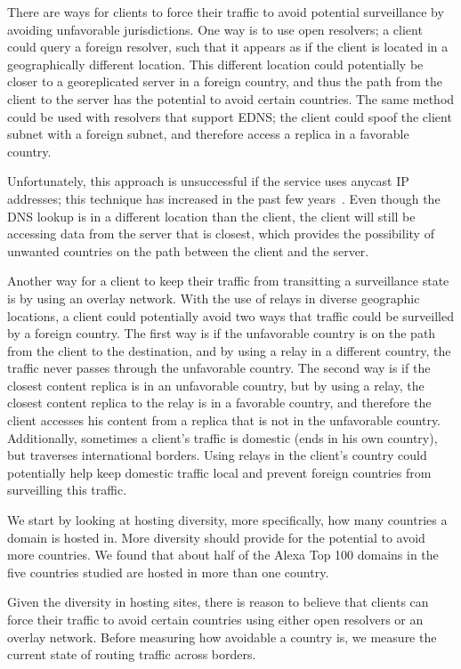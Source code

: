 There are ways for clients to force their traffic to avoid potential
surveillance by avoiding unfavorable jurisdictions.  One way is to use
open resolvers; a client could query a foreign resolver, such that it
appears as if the client is located in a geographically different
location.  This different location could potentially be closer to a
georeplicated server in a foreign country, and thus the path from the
client to the server has the potential to avoid certain countries.  The
same method could be used with resolvers that support EDNS; the client
could spoof the client subnet with a foreign subnet, and therefore
access a replica in a favorable country. 

Unfortunately, this approach is unsuccessful if the service uses anycast
IP addresses; this technique has increased in the past few
years~\cite{cicalese2015characterizing}.  Even though the DNS lookup is
in a different location than the client, the client will still be
accessing data from the server that is closest, which provides the
possibility of unwanted countries on the path between the client and the
server.   

Another way for a client to keep their traffic from transitting a
surveillance state is by using an overlay network.  With the use of
relays in diverse geographic locations, a client could potentially avoid
two ways that traffic could be surveilled by a foreign country.  The
first way is if the unfavorable country is on the path from the client
to the destination, and by using a relay in a different country, the
traffic never passes through the unfavorable country.  The second way is
if the closest content replica is in an unfavorable country, but by
using a relay, the closest content replica to the relay is in a
favorable country, and therefore the client accesses his content from a
replica that is not in the unfavorable country.  Additionally, sometimes
a client's traffic is domestic (ends in his own country), but traverses
international borders.  Using relays in the client's country could
potentially help keep domestic traffic local and prevent foreign
countries from surveilling this traffic. 

We start by looking at hosting diversity, more specifically, how many
countries a domain is hosted in.  More diversity should provide for the
potential to avoid more countries.  We found that about half of the
Alexa Top 100 domains in the five countries studied are hosted in more
than one country. 

Given the diversity in hosting sites, there is reason to believe that
clients can force their traffic to avoid certain countries using either
open resolvers or an overlay network.  Before measuring how avoidable a
country is, we measure the current state of routing traffic across
borders.  

